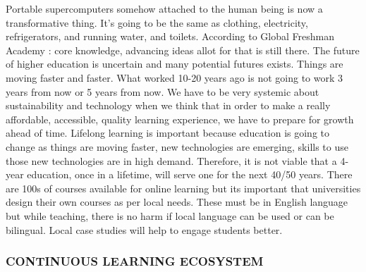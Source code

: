 \documentclass[]{elsarticle} %
\begin{document}
Portable supercomputers somehow attached to the human being is now a
transformative thing. It's going to be the same as clothing,
electricity, refrigerators, and running water, and toilets. According to
Global Freshman Academy : core knowledge, advancing ideas allot for that
is still there. The future of higher education is uncertain and many
potential futures exists. Things are moving faster and faster. What
worked 10-20 years ago is not going to work 3 years from now or 5 years
from now. We have to be very systemic about sustainability and
technology when we think that in order to make a really affordable,
accessible, quality learning experience, we have to prepare for growth
ahead of time. Lifelong learning is important because education is going
to change as things are moving faster, new technologies are emerging,
skills to use those new technologies are in high demand. Therefore, it
is not viable that a 4-year education, once in a lifetime, will serve
one for the next 40/50 years. There are 100s of courses available for
online learning but its important that universities design their own
courses as per local needs. These must be in English language but while
teaching, there is no harm if local language can be used or can be
bilingual. Local case studies will help to engage students better.

\hypertarget{continuous-learning-ecosystem}{%
\subsubsection{CONTINUOUS LEARNING
ECOSYSTEM}\label{continuous-learning-ecosystem}}
\end{document}
